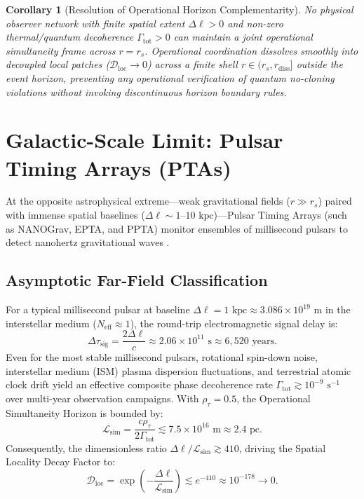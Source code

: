 \documentclass[11pt,a4paper]{article}
\newtheorem{corollary}{Corollary}
\begin{document}
\begin{corollary}[Resolution of Operational Horizon Complementarity]
No physical observer network with finite spatial extent $\Delta\ell > 0$ and non-zero thermal/quantum decoherence $\Gamma_{\mathrm{tot}} > 0$ can maintain a joint operational simultaneity frame across $r = r_s$. Operational coordination dissolves smoothly into decoupled local patches ($\mathcal{D}_{\mathrm{loc}} \to 0$) across a finite shell $r \in (r_s, r_{\mathrm{diss}}]$ outside the event horizon, preventing any operational verification of quantum no-cloning violations without invoking discontinuous horizon boundary rules.
\end{corollary}

\section{Galactic-Scale Limit: Pulsar Timing Arrays (PTAs)}

At the opposite astrophysical extreme—weak gravitational fields ($r \gg r_s$) paired with immense spatial baselines ($\Delta\ell \sim 1\text{--}10\text{ kpc}$)—Pulsar Timing Arrays (such as NANOGrav, EPTA, and PPTA) monitor ensembles of millisecond pulsars to detect nanohertz gravitational waves \cite{agazie2023}.

\subsection{Asymptotic Far-Field Classification}

For a typical millisecond pulsar at baseline $\Delta\ell = 1\text{ kpc} \approx 3.086 \times 10^{19}\text{ m}$ in the interstellar medium ($N_{\mathrm{eff}} \approx 1$), the round-trip electromagnetic signal delay is:
\begin{equation}
\Delta\tau_{\mathrm{sig}} = \frac{2 \Delta\ell}{c} \approx 2.06 \times 10^{11}\text{ s} \approx 6,520\text{ years}.
\end{equation}
Even for the most stable millisecond pulsars, rotational spin-down noise, interstellar medium (ISM) plasma dispersion fluctuations, and terrestrial atomic clock drift yield an effective composite phase decoherence rate $\Gamma_{\mathrm{tot}} \gtrsim 10^{-9}\text{ s}^{-1}$ over multi-year observation campaigns. With $\rho_\tau = 0.5$, the Operational Simultaneity Horizon is bounded by:
\begin{equation}
\mathcal{L}_{\mathrm{sim}} = \frac{c \rho_\tau}{2 \Gamma_{\mathrm{tot}}} \lesssim 7.5 \times 10^{16}\text{ m} \approx 2.4\text{ pc}.
\end{equation}
Consequently, the dimensionless ratio $\Delta\ell / \mathcal{L}_{\mathrm{sim}} \gtrsim 410$, driving the Spatial Locality Decay Factor to:
\begin{equation}
\mathcal{D}_{\mathrm{loc}} = \exp\left(-\frac{\Delta\ell}{\mathcal{L}_{\mathrm{sim}}}\right) \lesssim e^{-410} \approx 10^{-178} \to 0.
\end{equation}
\end{document}
